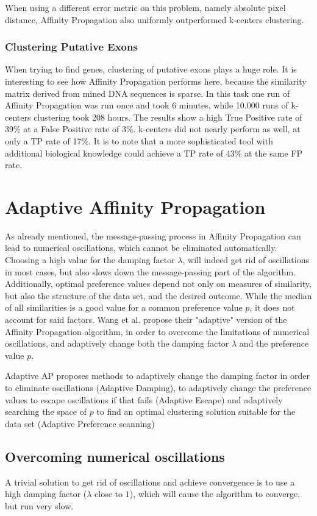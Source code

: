 \documentclass[11pt,a4paper]{article}
\begin{document}
When using a different error metric on this problem, namely absolute pixel distance, Affinity Propagation also uniformly outperformed k-centers clustering. \cite{frey2007clustering}
\subsubsection{Clustering Putative Exons}
When trying to find genes, clustering of putative exons plays a huge role. \cite{frey2007clustering} It is interesting to see how Affinity Propagation performs here, because the similarity matrix derived from mined DNA sequences is sparse. In this task one run of Affinity Propagation was run once and took 6 minutes, while 10.000 runs of k-centers clustering took 208 hours. The results show a high True Positive rate of 39\% at a False Positive rate of 3\%. k-centers did not nearly perform as well, at only a TP rate of 17\%. It is to note that a more sophisticated tool with additional biological knowledge could achieve a TP rate of 43\% at the same FP rate. \cite{frey2007clustering}
\pagebreak
\section{Adaptive Affinity Propagation}
As already mentioned, the message-passing process in Affinity Propagation can lead to numerical oscillations, which cannot be eliminated automatically. Choosing a high value for the damping factor $\lambda$, will indeed get rid of oscillations in most cases, but also slows down the message-passing part of the algorithm. Additionally, optimal preference values depend not only on measures of similarity, but also the structure of the data set, and the desired outcome. While the median of all similarities is a good value for a common preference value $p$, it does not account for said factors. Wang et al. propose their "adaptive" version of the Affinity Propagation algorithm, in order to overcome the limitations of numerical oscillations, and adaptively change both the damping factor $\lambda$ and the preference value $p$. \cite{wang2008adaptive}

Adaptive AP proposes methods to adaptively change the damping factor in order to eliminate oscillations (Adaptive Damping), to adaptively change the preference values to escape oscillations if that fails (Adaptive Escape) and adaptively searching the space of $p$ to find an optimal clustering solution suitable for the data set (Adaptive Preference scanning)
\subsection{Overcoming numerical oscillations}
A trivial solution to get rid of oscillations and achieve convergence is to use a high damping factor ($\lambda$ close to $1$), which will cause the algorithm to converge, but run very slow. \cite{wang2008adaptive}
\end{document}
